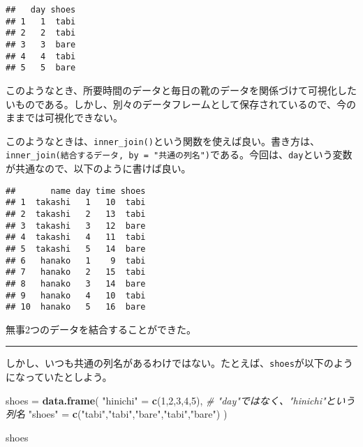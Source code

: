 \documentclass[]{book}
\newenvironment{Shaded}{\begin{snugshade}}{\end{snugshade}}
\newcommand{\KeywordTok}[1]{\textcolor[rgb]{0.13,0.29,0.53}{\textbf{#1}}}
\newcommand{\DataTypeTok}[1]{\textcolor[rgb]{0.13,0.29,0.53}{#1}}
\newcommand{\DecValTok}[1]{\textcolor[rgb]{0.00,0.00,0.81}{#1}}
\newcommand{\StringTok}[1]{\textcolor[rgb]{0.31,0.60,0.02}{#1}}
\newcommand{\CommentTok}[1]{\textcolor[rgb]{0.56,0.35,0.01}{\textit{#1}}}
\newcommand{\OperatorTok}[1]{\textcolor[rgb]{0.81,0.36,0.00}{\textbf{#1}}}
\newcommand{\NormalTok}[1]{#1}
\begin{document}
\begin{verbatim}
##   day shoes
## 1   1  tabi
## 2   2  tabi
## 3   3  bare
## 4   4  tabi
## 5   5  bare
\end{verbatim}

このようなとき、所要時間のデータと毎日の靴のデータを関係づけて可視化したいものである。しかし、別々のデータフレームとして保存されているので、今のままでは可視化できない。

このようなときは、\texttt{inner\_join()}という関数を使えば良い。書き方は、\texttt{inner\_join(結合するデータ,\ by\ =\ "共通の列名")}である。今回は、\texttt{day}という変数が共通なので、以下のように書けば良い。

\begin{Shaded}
\end{Shaded}

\begin{verbatim}
##       name day time shoes
## 1  takashi   1   10  tabi
## 2  takashi   2   13  tabi
## 3  takashi   3   12  bare
## 4  takashi   4   11  tabi
## 5  takashi   5   14  bare
## 6   hanako   1    9  tabi
## 7   hanako   2   15  tabi
## 8   hanako   3   14  bare
## 9   hanako   4   10  tabi
## 10  hanako   5   16  bare
\end{verbatim}

無事2つのデータを結合することができた。

\begin{center}\rule{0.5\linewidth}{\linethickness}\end{center}

しかし、いつも共通の列名があるわけではない。たとえば、\texttt{shoes}が以下のようになっていたとしよう。

\begin{Shaded}
\begin{Highlighting}[]
\NormalTok{shoes =}\StringTok{ }\KeywordTok{data.frame}\NormalTok{(}
  \StringTok{"hinichi"}\NormalTok{ =}\StringTok{ }\KeywordTok{c}\NormalTok{(}\DecValTok{1}\NormalTok{,}\DecValTok{2}\NormalTok{,}\DecValTok{3}\NormalTok{,}\DecValTok{4}\NormalTok{,}\DecValTok{5}\NormalTok{), }\CommentTok{# "day"ではなく、"hinichi"という列名}
  \StringTok{"shoes"}\NormalTok{ =}\StringTok{ }\KeywordTok{c}\NormalTok{(}\StringTok{"tabi"}\NormalTok{,}\StringTok{"tabi"}\NormalTok{,}\StringTok{"bare"}\NormalTok{,}\StringTok{"tabi"}\NormalTok{,}\StringTok{"bare"}\NormalTok{)}
\NormalTok{)}

\NormalTok{shoes}
\end{Highlighting}
\end{Shaded}
\end{document}
